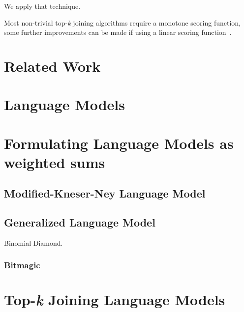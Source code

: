 \documentclass[11pt,a4paper]{report}
\begin{document}
We apply that technique.

Most non-trivial top-\emph{k} joining algorithms require a monotone scoring
function, some further improvements can be made if using a linear scoring
function~\parencite{Ilyas2008}.

\chapter{Related Work}

\chapter{Language Models}

\chapter{Formulating Language Models as weighted sums}
\label{chp-lm-score-func}

\section{Modified-Kneser-Ney Language Model}

\section{Generalized Language Model}

Binomial Diamond.

\subsection{Bitmagic}

\chapter{Top-\emph{k} Joining Language Models}

\end{document}
